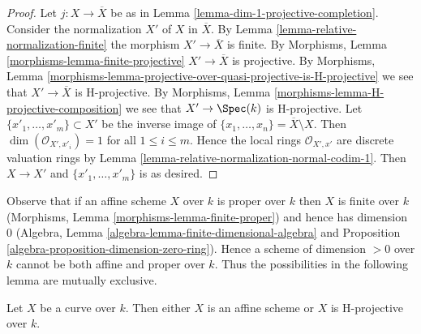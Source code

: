 \begin{proof}
Let $j : X \to \overline{X}$ be as in
Lemma \ref{lemma-dim-1-projective-completion}.
Consider the normalization $X'$ of $X$ in
$\overline{X}$. By Lemma \ref{lemma-relative-normalization-finite}
the morphism $X' \to \overline{X}$ is finite.
By Morphisms, Lemma \ref{morphisms-lemma-finite-projective}
$X' \to \overline{X}$ is projective. By Morphisms, Lemma
\ref{morphisms-lemma-projective-over-quasi-projective-is-H-projective}
we see that $X' \to \overline{X}$ is H-projective.
By Morphisms, Lemma \ref{morphisms-lemma-H-projective-composition}
we see that $X' \to \Spec(k)$ is H-projective.
Let $\{x'_1, \ldots, x'_m\} \subset X'$ be the inverse
image of $\{x_1, \ldots, x_n\} = \overline{X} \setminus X$.
Then $\dim(\mathcal{O}_{X', x'_i}) = 1$ for all $1 \leq i \leq m$.
Hence the local rings $\mathcal{O}_{X', x'}$
are discrete valuation rings by
Lemma \ref{lemma-relative-normalization-normal-codim-1}.
Then $X \to X'$ and $\{x'_1, \ldots, x'_m\}$ is as desired.
\end{proof}

\noindent
Observe that if an affine scheme $X$ over $k$ is proper over $k$
then $X$ is finite over $k$ (Morphisms, Lemma
\ref{morphisms-lemma-finite-proper}) and hence has
dimension $0$
(Algebra, Lemma \ref{algebra-lemma-finite-dimensional-algebra} and
Proposition \ref{algebra-proposition-dimension-zero-ring}).
Hence a scheme of dimension $> 0$ over $k$ cannot be both affine and
proper over $k$. Thus the possibilities in the following lemma are
mutually exclusive.

\begin{lemma}
\label{lemma-curve-affine-projective}
Let $X$ be a curve over $k$. Then either $X$ is an affine scheme or $X$
is H-projective over $k$.
\end{lemma}

